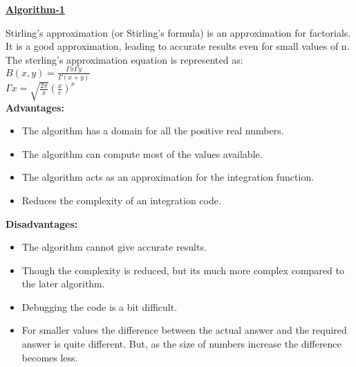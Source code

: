 \documentclass{report}
\begin{document}
    \begin{center}
        \Large\textbf{\underline{Algorithm-1}}
    \end{center}


Stirling's approximation (or Stirling's formula) is an approximation for factorials. It is a good approximation, leading to accurate results even for small values of n. \\
The sterling's approximation equation is represented as:\\

$B(x,y)=\frac{\Gamma x \Gamma y}{\Gamma (x+y)}$\\
\newline
$\Gamma x = \sqrt{\frac{2 \pi}{x}}(\frac{x}{e})^x$\\

\textbf{Advantages:}
\begin{itemize}
    \item The algorithm has a domain for all the positive real numbers.
    \item The algorithm can compute most of the values available.
    \item The algorithm acts as an approximation for the integration function.
    \item Reduces the complexity of an integration code.
\end{itemize}


\textbf{Disadvantages:}
\begin{itemize}
    \item The algorithm cannot give accurate results.
    \item Though the complexity is reduced, but its much more complex compared to the later algorithm.
    \item Debugging the code is a bit difficult.
    \item For smaller values the difference between the actual answer and the required answer is quite different. But, as the size of numbers increase the difference becomes less.
\end{itemize}
\end{document}
